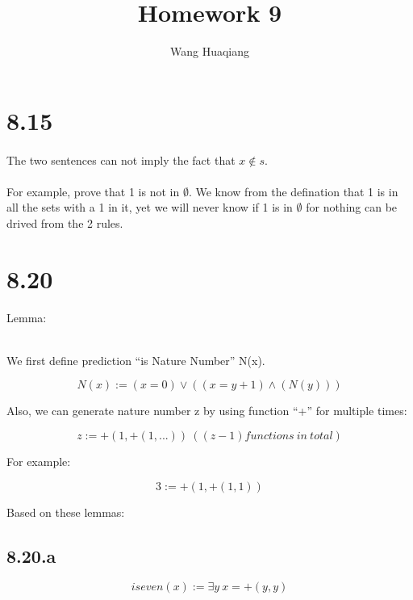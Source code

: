 \documentclass{article} %
\title{Homework 9}
\author{Wang Huaqiang}
\begin{document}
	\maketitle


  \hypertarget{section}{%
  \section{8.15}\label{section}}
  
  \paragraph{}
  
  The two sentences can not imply the fact that \(x \notin s\).
  
  \paragraph{}
  
  For example, prove that 1 is not in \(\emptyset\). We know from the
  defination that 1 is in all the sets with a 1 in it, yet we will never
  know if 1 is in \(\emptyset\) for nothing can be drived from the 2
  rules.
  
  \hypertarget{section-1}{%
  \section{8.20}\label{section-1}}
  
  Lemma:
  
  ~\\
  
  We first define prediction ``is Nature Number'' N(x).
  
  \[N(x):=  (x=0)\vee((x=y+1)\wedge(N(y))) \]
  
  Also, we can generate nature number z by using function ``+'' for
  multiple times:
  
  \[z := +(1,+(1,...)) \ ((z-1)functions \ in \ total)\]
  
  For example:
  
  \[3:=  +(1,+(1,1)) \]
  
  Based on these lemmas:
  
  \hypertarget{a}{%
  \subsection{8.20.a}\label{a}}
  
  \[iseven(x) := \exists y \ x = +(y,y)\]
  
\end{document}

